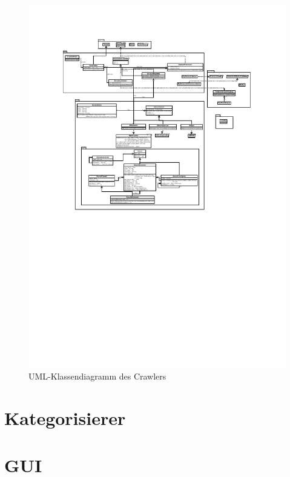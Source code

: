 \begin{figure}[p]
\includegraphics[scale=1]{vorlaeufigeDiagramme/uml_crawler.pdf}
\caption{UML-Klassendiagramm des Crawlers}
\end{figure}

\section{Kategorisierer}

\section{GUI}


